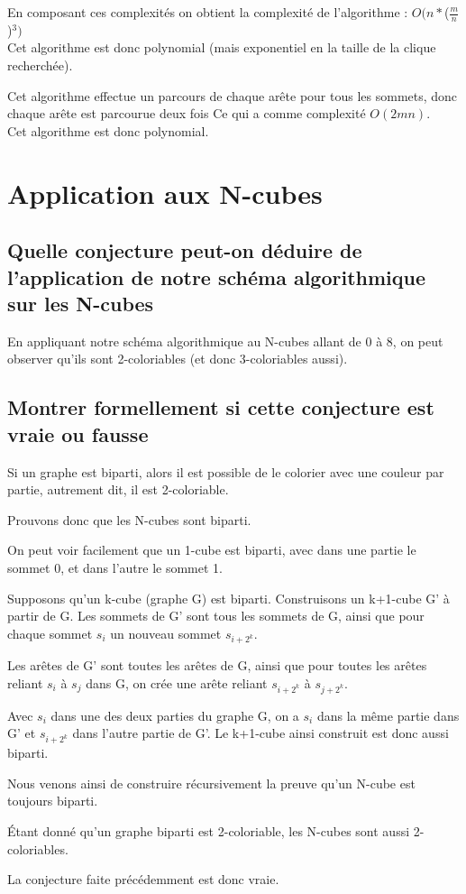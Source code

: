 \documentclass[a4paper, 11pt]{article}
\begin{document}
    En composant ces complexités on obtient la complexité de l'algorithme : $O(n*$($\frac{m}{n}$)$^3)$\\
    Cet algorithme est donc polynomial (mais exponentiel en la taille de la clique recherchée).

    \label{subsubsec:Q3E3}
    Cet algorithme effectue un parcours de chaque arête pour tous les sommets, donc chaque arête est parcourue deux fois
    Ce qui a comme complexité $O(2mn)$.\\
    Cet algorithme est donc polynomial.

    \section{Application aux N-cubes}\label{sec:application-aux-n-cubes}

    \subsection{Quelle conjecture peut-on déduire de l'application de notre schéma algorithmique sur les N-cubes}\label{subsec:Q4C}
    En appliquant notre schéma algorithmique au N-cubes allant de 0 à 8, on peut observer qu'ils sont 2-coloriables (et donc 3-coloriables aussi).

    \subsection{Montrer formellement si cette conjecture est vraie ou fausse}\label{subsec:Q4D}
    Si un graphe est biparti, alors il est possible de le colorier avec une couleur par partie, autrement dit, il est 2-coloriable.

    Prouvons donc que les N-cubes sont biparti.\bigskip

    On peut voir facilement que un 1-cube est biparti, avec dans une partie le sommet 0, et dans l'autre le sommet 1.

    Supposons qu'un k-cube (graphe G) est biparti.
    Construisons un k+1-cube G' à partir de G.
    Les sommets de G' sont tous les sommets de G, ainsi que pour chaque sommet $s_i$ un nouveau sommet $s_{i+2^k}$.

    Les arêtes de G' sont toutes les arêtes de G,
    ainsi que pour toutes les arêtes reliant $s_i$ à $s_j$ dans G, on crée une arête reliant $s_{i+2^k}$ à $s_{j+2^k}$.

    Avec $s_i$ dans une des deux parties du graphe G,
    on a $s_i$ dans la même partie dans G' et $s_{i+2^k}$ dans l'autre partie de G'.
    Le k+1-cube ainsi construit est donc aussi biparti.

    \bigskip
    Nous venons ainsi de construire récursivement la preuve qu'un N-cube est toujours biparti.

    Étant donné qu'un graphe biparti est 2-coloriable, les N-cubes sont aussi 2-coloriables.

    La conjecture faite précédemment est donc vraie.
\end{document}
